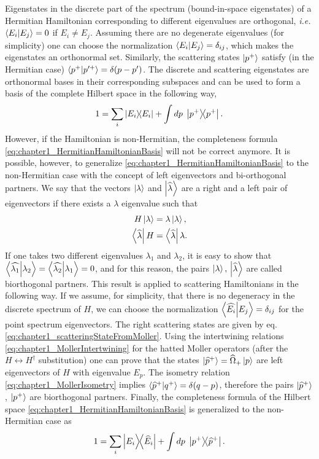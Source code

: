 Eigenstates in the discrete part of the spectrum (bound-in-space eigenstates) of a Hermitian Hamiltonian corresponding to different eigenvalues are orthogonal, \textit{i.e.} $\braket{E_i}{E_j} =0$ if $E_i\neq E_j$. Assuming there are no degenerate eigenvalues (for simplicity) one can choose the normalization $\braket{E_i}{E_j} =\delta_{ij}$, which makes the  eigenstates an orthonormal set. Similarly, the scattering states $\ket{p^+}$ satisfy (in the Hermitian case) $\braket{p^+}{p'^+} =\delta(p-p')$. The discrete and scattering eigenstates are orthonormal bases in their corresponding subspaces and can be used to form a basis of the complete Hilbert space in the following way,
%
\begin{equation}
  1 = \sum_i \ketbra{E_i}{E_i} + \int dp\; \ketbra{p^+}{p^+}.
  \label{eq:chapter1_HermitianHamiltonianBasis}
\end{equation}
%
However, if the Hamiltonian is non-Hermitian, the completeness formula \eqref{eq:chapter1_HermitianHamiltonianBasis} will not be correct anymore. It is possible, however, to generalize \eqref{eq:chapter1_HermitianHamiltonianBasis} to the non-Hermitian case with the concept of left eigenvectors and bi-orthogonal partners. We say that the vectors $\ket{\lambda}$ and $\ket{\widehat{\lambda}}$ are a right and a left pair of eigenvectors if there exists a $\lambda$ eigenvalue such that
%
\begin{align}
  H \ket{\lambda} &= \lambda \ket{\lambda},\nonumber\\
  \bra{\widehat{\lambda}} H  &= \bra{\widehat{\lambda}}\lambda.
  \label{eq:chapter1_leftAndRightEigenvector}
\end{align}
%
If one takes two different eigenvalues $\lambda_1$ and $\lambda_2$, it is easy to show that $\braket{\widehat{\lambda_1}}{\lambda_2}=\braket{\widehat{\lambda_2}}{\lambda_1}=0$, and for this reason, the pairs $\ket{\lambda},\,\ket{\widehat{\lambda}}$ are called biorthogonal partners. This result is applied to scattering Hamiltonians in the following way. If we assume, for simplicity, that there is no degeneracy in the discrete spectrum of $H$, we can choose the normalization $\braket{\widehat{E_i}}{E_j} = \delta_{ij}$ for the point spectrum eigenvectors. The right scattering states are given by eq. \eqref{eq:chapter1_scatteringStateFromMoller}. Using the intertwining relations \eqref{eq:chapter1_MollerIntertwining} for the hatted Moller operators (after the $H\leftrightarrow H^\dagger$ substitution) one can prove that the states $\ket{\widehat{p}^+} = \widehat{\Omega}_+\ket{p}$ are left eigenvectors of $H$ with eigenvalue $E_p$. The isometry relation \eqref{eq:chapter1_MollerIsometry} implies $\braket{\widehat{p}^+}{q^+} = \delta(q-p)$, therefore the pairs $\ket{\widehat{p}^+}$, $\ket{p^+}$ are biorthogonal partners. Finally, the completeness formula of the Hilbert space \eqref{eq:chapter1_HermitianHamiltonianBasis} is generalized to the non-Hermitian case as
%
\begin{equation}
  1 = \sum_i \ketbra{E_i}{\widehat{E}_i} + \int dp\; \ketbra{p^+}{\widehat{p}^+}.
  \label{eq:chapter1_NonHermitianHamiltonianBasis}
\end{equation}
%

